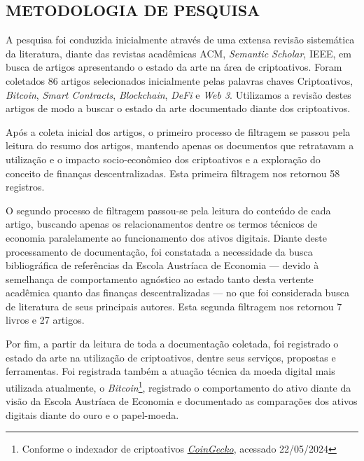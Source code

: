 \documentclass[article,12pt,oneside,a4paper,english,brazil]{unifil}
\begin{document}
\begin{Spacing}{1.5}

% 


\section*{METODOLOGIA DE PESQUISA}
A pesquisa foi conduzida inicialmente através de uma extensa revisão sistemática da literatura, diante das revistas acadêmicas ACM, \textit{Semantic Scholar}, IEEE, em busca de artigos apresentando o estado da arte na área de criptoativos. Foram coletados 86 artigos selecionados inicialmente pelas palavras chaves Criptoativos, \textit{Bitcoin}, \textit{Smart Contracts}, \textit{Blockchain}, \textit{DeFi} e \textit{Web 3}. Utilizamos a revisão destes artigos de modo a buscar o estado da arte documentado diante dos criptoativos.

Após a coleta inicial dos artigos, o primeiro processo de filtragem se passou pela leitura do resumo dos artigos, mantendo apenas os documentos que retratavam a utilização e o impacto socio-econômico dos criptoativos e a exploração do conceito de finanças descentralizadas. Esta primeira filtragem nos retornou 58 registros.

O segundo processo de filtragem passou-se pela leitura do conteúdo de cada artigo, buscando apenas os relacionamentos dentre os termos técnicos de economia paralelamente ao funcionamento dos ativos digitais. Diante deste processamento de documentação, foi constatada a necessidade da busca bibliográfica de referências da Escola Austríaca de Economia — devido à semelhança de comportamento agnóstico ao estado tanto desta vertente acadêmica quanto das finanças descentralizadas — no que foi considerada busca de literatura de seus principais autores. Esta segunda filtragem nos retornou 7 livros e 27 artigos.

Por fim, a partir da leitura de toda a documentação coletada, foi registrado o estado da arte na utilização de criptoativos, dentre seus serviços, propostas e ferramentas. Foi registrada também a atuação técnica da moeda digital mais utilizada atualmente, o \textit{Bitcoin}\footnote{Conforme o indexador de criptoativos \href{https://www.coingecko.com/pt}{\textit{CoinGecko}}, acessado 22/05/2024}, registrado o comportamento do ativo diante da visão da Escola Austríaca de Economia e documentado as comparações dos ativos digitais diante do ouro e o papel-moeda.


\end{Spacing}
\end{document}
